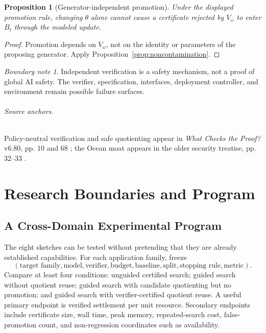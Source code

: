 \documentclass[11pt,oneside]{book}
\newtheorem{proposition}[theorem]{Proposition}
\theoremstyle{definition}
\theoremstyle{remark}
\newtheorem{boundary}[theorem]{Boundary note}
\begin{document}
\begin{proposition}[Generator-independent promotion]
Under the displayed promotion rule, changing \(\theta\) alone cannot cause a certificate rejected by
\(V_\omega\) to enter \(B_t\) through the modeled update.
\end{proposition}

\begin{proof}
Promotion depends on \(V_\omega\), not on the identity or parameters of the proposing generator.
Apply Proposition~\ref{prop:noncontamination}.
\end{proof}

\begin{boundary}
Independent verification is a safety mechanism, not a proof of global AI safety. The verifier,
specification, interfaces, deployment controller, and environment remain possible failure surfaces.
\end{boundary}

\paragraph{Source anchors.} Policy-neutral verification and safe quotienting appear in
\emph{What Checks the Proof?} v6.80, pp. 10 and 68 \cite{TennesonChecks}; the Ocean moat appears
in the older security treatise, pp. 32--33 \cite{TennesonSecurity}.

\part{Research Boundaries and Program}

\chapter{A Cross-Domain Experimental Program}

The eight sketches can be tested without pretending that they are already established capabilities.
For each application family, freeze
\[
(\text{target family},\text{model},\text{verifier},\text{budget},\text{baseline},
\text{split},\text{stopping rule},\text{metric}).
\]
Compare at least four conditions: unguided certified search; guided search without quotient reuse;
guided search with candidate quotienting but no promotion; and guided search with verifier-certified
quotient reuse. A useful primary endpoint is verified settlement per unit resource. Secondary
endpoints include certificate size, wall time, peak memory, repeated-search cost, false-promotion
count, and non-regression coordinates such as availability.
\end{document}
